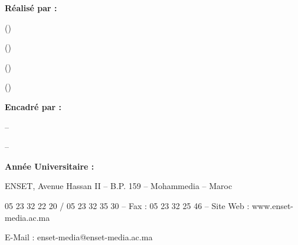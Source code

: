 \begin{titlepage}
\vspace{2cm}
\begin{minipage}[t]{0.45\textwidth}
  \raggedright
  {\large\bfseries R\'ealis\'e par :\par}
  \vspace{0.35cm}
  \EtudiantUn \quad(\FiliereUn)\par
  \vspace{0.18cm}
  \EtudiantDeux  \quad(\FiliereDeux)\par
  \vspace{0.18cm}
  \EtudiantTrois \quad(\FiliereTrois)\par
  \vspace{0.18cm}
  \EtudiantQuatre \quad(\FiliereQuatre )\par
\end{minipage}
\hfill
\begin{minipage}[t]{0.45\textwidth}
  \raggedright
  {\large\bfseries Encadr\'e par :\par}
  \vspace{0.35cm}
  -- \EncadrantUn\par
  \vspace{0.18cm}
  -- \EncadrantDeux\par
\end{minipage}

\vfill
{\large\bfseries Ann\'ee Universitaire : \AnneeUniversitaire\par}

\vspace{0.45cm}
{\footnotesize
ENSET, Avenue Hassan II -- B.P. 159 -- Mohammedia -- Maroc\par
05 23 32 22 20 / 05 23 32 35 30 -- Fax : 05 23 32 25 46 -- Site Web : www.enset-media.ac.ma\par
E-Mail : enset-media@enset-media.ac.ma\par
}

\restoregeometry
\end{titlepage}
